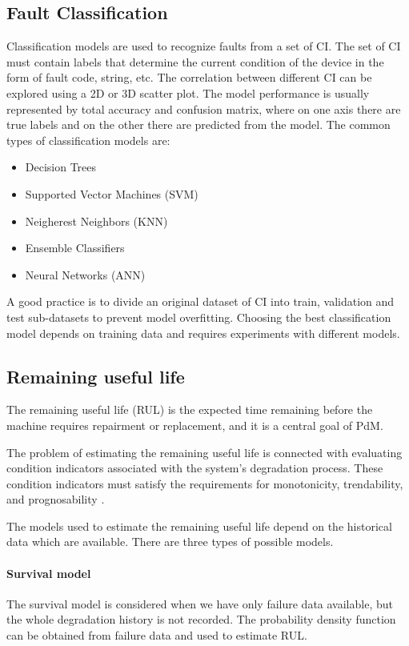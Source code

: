 \subsection{Fault Classification}
Classification models are used to recognize faults from a set of CI. The
set of CI must contain labels that determine the current condition of the
device in the form of fault code, string, etc. The correlation between
different CI can be explored using a 2D or 3D scatter plot. The model
performance is usually represented by total accuracy and confusion matrix,
where on one axis there are true labels and on the other there are
predicted from the model. The common types of classification models are:

\begin{itemize}
    \item Decision Trees
    \item Supported Vector Machines (SVM)
    \item Neigherest Neighbors (KNN)
    \item Ensemble Classifiers
    \item Neural Networks (ANN)
\end{itemize}

A good practice is to divide an original dataset of CI into train,
validation and test sub-datasets to prevent model overfitting. Choosing the
best classification model depends on training data and requires experiments
with different models.

\subsection{Remaining useful life}

The remaining useful life (RUL) is the expected time remaining before the
machine requires repairment or replacement, and it is a central goal of
PdM.

The problem of estimating the remaining useful life is connected with
evaluating condition indicators associated with the system's degradation
process. These condition indicators must satisfy the requirements for
monotonicity, trendability, and prognosability \cite{matlab_full}.

The models used to estimate the remaining useful life depend on the
historical data which are available. There are three types of possible
models. 

\paragraph{Survival model}
The survival model is considered when we have only failure data available,
but the whole degradation history is not recorded. The probability density
function can be obtained from failure data and used to estimate RUL.

